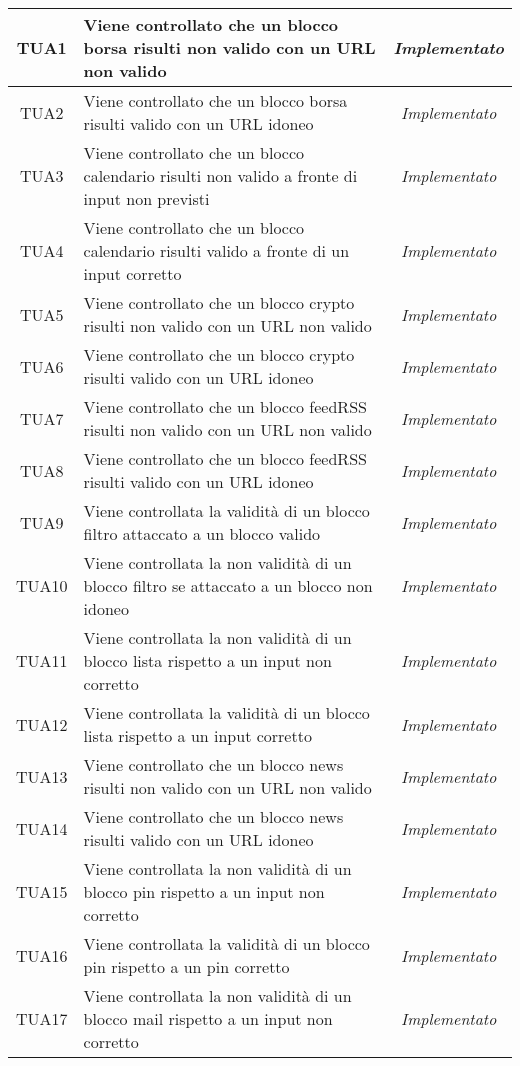 \begin{longtable}{|c|m{12em}|c|}
TUA1 & Viene controllato che un blocco borsa risulti non valido con un URL non valido & \textit{Implementato}\\ \hline
TUA2 & Viene controllato che un blocco borsa risulti valido con un URL idoneo & \textit{Implementato}\\ \hline
TUA3 & Viene controllato che un blocco calendario risulti non valido a fronte di input non previsti& \textit{Implementato}\\ \hline
TUA4 & Viene controllato che un blocco calendario risulti valido a fronte di un input corretto & \textit{Implementato}\\ \hline
TUA5 & Viene controllato che un blocco crypto risulti non valido con un URL non valido & \textit{Implementato}\\ \hline
TUA6 & Viene controllato che un blocco crypto risulti valido con un URL idoneo & \textit{Implementato}\\ \hline
TUA7 & Viene controllato che un blocco feedRSS risulti non valido con un URL non valido & \textit{Implementato}\\ \hline
TUA8 & Viene controllato che un blocco feedRSS risulti valido con un URL idoneo & \textit{Implementato}\\ \hline
TUA9 & Viene controllata la validità di un blocco filtro attaccato a un blocco valido & \textit{Implementato}\\ \hline
TUA10 & Viene controllata la non validità di un blocco filtro se attaccato a un blocco non idoneo& \textit{Implementato}\\ \hline
TUA11 & Viene controllata la non validità  di un blocco lista rispetto a un input non corretto & \textit{Implementato}\\ \hline
TUA12 & Viene controllata la validità di un blocco lista rispetto a un input corretto & \textit{Implementato}\\ \hline
TUA13 & Viene controllato che un blocco news risulti non valido con un URL non valido  & \textit{Implementato}\\ \hline
TUA14 & Viene controllato che un blocco news risulti valido con un URL idoneo& \textit{Implementato}\\ \hline
TUA15 & Viene controllata la non validità di un blocco pin rispetto a un input non corretto & \textit{Implementato}\\ \hline
TUA16 & Viene controllata la validità di un blocco pin rispetto a un pin corretto & \textit{Implementato}\\ \hline
TUA17 & Viene controllata la non validità di un blocco mail rispetto a un input non corretto& \textit{Implementato}\\ \hline

\end{longtable}
